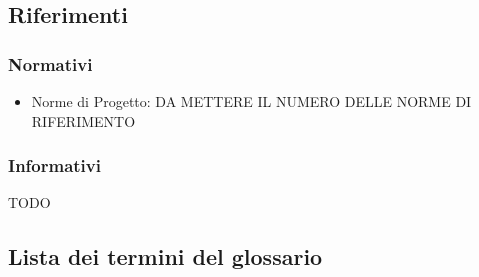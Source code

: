 \documentclass[12pt,a4paper]{article}
\begin{document}
\subsection{Riferimenti}
\subsubsection{Normativi}
\begin{itemize}
	\item {Norme di Progetto: DA METTERE IL NUMERO DELLE NORME DI RIFERIMENTO}
\end{itemize}
\subsubsection{Informativi}
TODO
\subsection{Lista dei termini del glossario}
\end{document}
